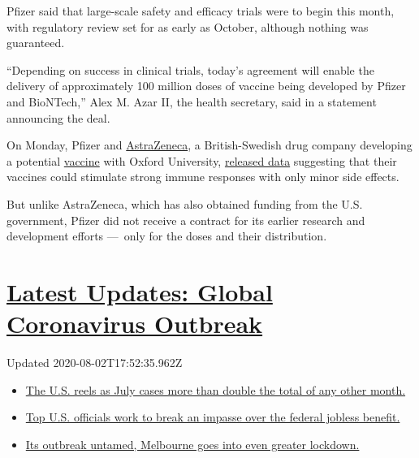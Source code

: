 Pfizer said that large-scale safety and efficacy trials were to begin
this month, with regulatory review set for as early as October, although
nothing was guaranteed.

``Depending on success in clinical trials, today's agreement will enable
the delivery of approximately 100 million doses of vaccine being
developed by Pfizer and BioNTech,'' Alex M. Azar II, the health
secretary, said in a statement announcing the deal.

On Monday, Pfizer and
\href{https://www.nytimes.com/2020/05/21/health/coronavirus-vaccine-astrazeneca.html}{AstraZeneca},
a British-Swedish drug company developing a potential
\href{https://www.nytimes.com/interactive/2020/06/09/magazine/covid-vaccine.html}{vaccine}
with Oxford University,
\href{https://www.nytimes.com/2020/07/20/world/covid-coronavirus-vaccine.html}{released
data} suggesting that their vaccines could stimulate strong immune
responses with only minor side effects.

But unlike AstraZeneca, which has also obtained funding from the U.S.
government, Pfizer did not receive a contract for its earlier research
and development efforts ---~only for the doses and their distribution.

\hypertarget{latest-updates-global-coronavirus-outbreak}{%
\section{\texorpdfstring{\href{https://www.nytimes.com/2020/08/01/world/coronavirus-covid-19.html?action=click\&pgtype=Article\&state=default\&region=MAIN_CONTENT_1\&context=storylines_live_updates}{Latest
Updates: Global Coronavirus
Outbreak}}{Latest Updates: Global Coronavirus Outbreak}}\label{latest-updates-global-coronavirus-outbreak}}

Updated 2020-08-02T17:52:35.962Z

\begin{itemize}
\tightlist
\item
  \href{https://www.nytimes.com/2020/08/01/world/coronavirus-covid-19.html?action=click\&pgtype=Article\&state=default\&region=MAIN_CONTENT_1\&context=storylines_live_updates\#link-34047410}{The
  U.S. reels as July cases more than double the total of any other
  month.}
\item
  \href{https://www.nytimes.com/2020/08/01/world/coronavirus-covid-19.html?action=click\&pgtype=Article\&state=default\&region=MAIN_CONTENT_1\&context=storylines_live_updates\#link-780ec966}{Top
  U.S. officials work to break an impasse over the federal jobless
  benefit.}
\item
  \href{https://www.nytimes.com/2020/08/01/world/coronavirus-covid-19.html?action=click\&pgtype=Article\&state=default\&region=MAIN_CONTENT_1\&context=storylines_live_updates\#link-2bc8948}{Its
  outbreak untamed, Melbourne goes into even greater lockdown.}
\end{itemize}

